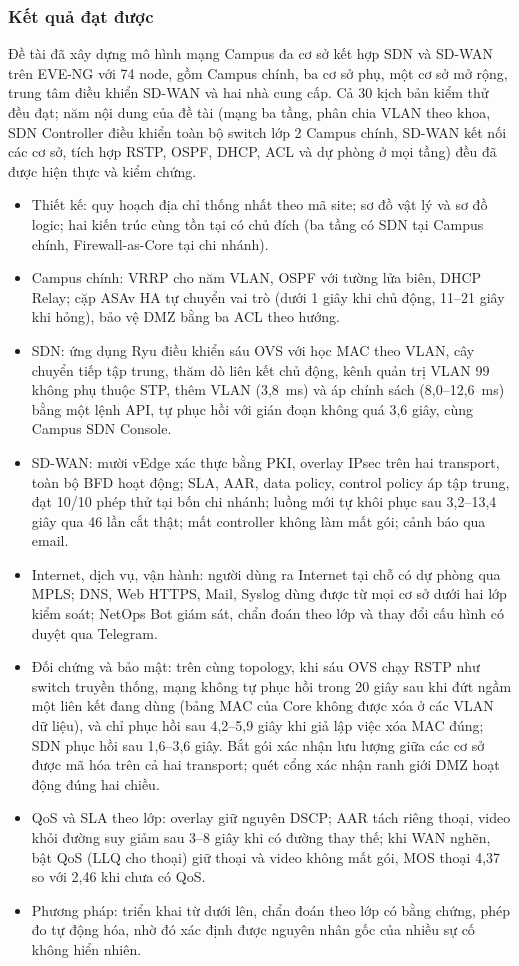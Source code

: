 \subsubsection{Kết quả đạt được}

Đề tài đã xây dựng mô hình mạng Campus đa cơ sở kết hợp SDN và SD-WAN trên EVE-NG với 74 node, gồm Campus chính, ba cơ sở phụ, một cơ sở mở rộng, trung tâm điều khiển SD-WAN và hai nhà cung cấp. Cả 30 kịch bản kiểm thử đều đạt; năm nội dung của đề tài (mạng ba tầng, phân chia VLAN theo khoa, SDN Controller điều khiển toàn bộ switch lớp 2 Campus chính, SD-WAN kết nối các cơ sở, tích hợp RSTP, OSPF, DHCP, ACL và dự phòng ở mọi tầng) đều đã được hiện thực và kiểm chứng.
\begin{itemize}
    \item Thiết kế: quy hoạch địa chỉ thống nhất theo mã site; sơ đồ vật lý và sơ đồ logic; hai kiến trúc cùng tồn tại có chủ đích (ba tầng có SDN tại Campus chính, Firewall-as-Core tại chi nhánh).
    \item Campus chính: VRRP cho năm VLAN, OSPF với tường lửa biên, DHCP Relay; cặp ASAv HA tự chuyển vai trò (dưới 1 giây khi chủ động, 11--21 giây khi hỏng), bảo vệ DMZ bằng ba ACL theo hướng.
    \item SDN: ứng dụng Ryu điều khiển sáu OVS với học MAC theo VLAN, cây chuyển tiếp tập trung, thăm dò liên kết chủ động, kênh quản trị VLAN 99 không phụ thuộc STP, thêm VLAN (3,8~ms) và áp chính sách (8,0--12,6~ms) bằng một lệnh API, tự phục hồi với gián đoạn không quá 3,6 giây, cùng Campus SDN Console.
    \item SD-WAN: mười vEdge xác thực bằng PKI, overlay IPsec trên hai transport, toàn bộ BFD hoạt động; SLA, AAR, data policy, control policy áp tập trung, đạt 10/10 phép thử tại bốn chi nhánh; luồng mới tự khôi phục sau 3,2--13,4 giây qua 46 lần cắt thật; mất controller không làm mất gói; cảnh báo qua email.
    \item Internet, dịch vụ, vận hành: người dùng ra Internet tại chỗ có dự phòng qua MPLS; DNS, Web HTTPS, Mail, Syslog dùng được từ mọi cơ sở dưới hai lớp kiểm soát; NetOps Bot giám sát, chẩn đoán theo lớp và thay đổi cấu hình có duyệt qua Telegram.
    \item Đối chứng và bảo mật: trên cùng topology, khi sáu OVS chạy RSTP như switch truyền thống, mạng không tự phục hồi trong 20 giây sau khi đứt ngầm một liên kết đang dùng (bảng MAC của Core không được xóa ở các VLAN dữ liệu), và chỉ phục hồi sau 4,2--5,9 giây khi giả lập việc xóa MAC đúng; SDN phục hồi sau 1,6--3,6 giây. Bắt gói xác nhận lưu lượng giữa các cơ sở được mã hóa trên cả hai transport; quét cổng xác nhận ranh giới DMZ hoạt động đúng hai chiều.
    \item QoS và SLA theo lớp: overlay giữ nguyên DSCP; AAR tách riêng thoại, video khỏi đường suy giảm sau 3--8 giây khi có đường thay thế; khi WAN nghẽn, bật QoS (LLQ cho thoại) giữ thoại và video không mất gói, MOS thoại 4,37 so với 2,46 khi chưa có QoS.
    \item Phương pháp: triển khai từ dưới lên, chẩn đoán theo lớp có bằng chứng, phép đo tự động hóa, nhờ đó xác định được nguyên nhân gốc của nhiều sự cố không hiển nhiên.
\end{itemize}

